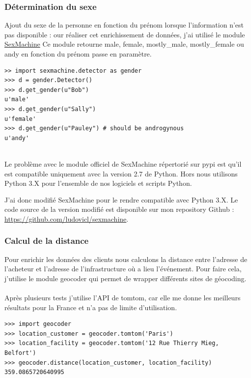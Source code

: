 \subsubsection{Détermination du sexe}
Ajout du sexe de la personne en fonction du prénom lorsque l'information n'est pas disponible :
our réaliser cet enrichissement de données, j'ai utilisé le module 
\href{https://github.com/ferhatelmas/sexmachine/}{SexMachine}
Ce module retourne male, female, mostly\_male, mostly\_female ou andy en fonction du prénom passe en paramètre.

\lstset{style=custompython}
\begin{lstlisting}
>> import sexmachine.detector as gender
>>> d = gender.Detector()
>>> d.get_gender(u"Bob")
u'male'
>>> d.get_gender(u"Sally")
u'female'
>>> d.get_gender(u"Pauley") # should be androgynous
u'andy'
\end{lstlisting}
\leavevmode \\
Le problème avec le module officiel de SexMachine répertorié sur pypi est qu'il est compatible uniquement avec la version 2.7 de Python. Hors nous utilisons Python 3.X pour l'ensemble de nos logiciels et scripts Python. 

J'ai donc modifié SexMachine pour le rendre compatible avec Python 3.X. Le code source de la version modifié est disponible sur mon repository Github : \href{https://github.com/ludovicl/sexmachine}{https://github.com/ludovicl/sexmachine}.

\subsubsection{Calcul de la distance}

Pour enrichir les données des clients nous calculons la distance entre l'adresse de l'acheteur et l'adresse de l'infrastructure où a lieu l'événement.
Pour faire cela, j'utilise le module geocoder qui permet de wrapper différents sites de géocoding.
\\ \\
Après plusieurs tests j'utilise l'API de tomtom, car elle me donne les meilleurs résultats pour la France et n'a pas de limite d'utilisation.

\lstset{style=custompython}
\begin{lstlisting}
>>> import geocoder
>>> location_customer = geocoder.tomtom('Paris')
>>> location_facility = geocoder.tomtom('12 Rue Thierry Mieg, Belfort')
>>> geocoder.distance(location_customer, location_facility)
359.0865720640995
\end{lstlisting}
\leavevmode \\

